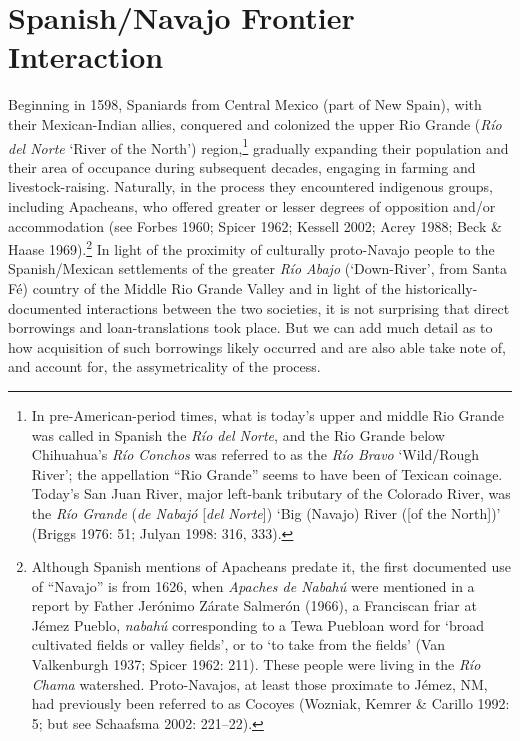 \section{Spanish/Navajo Frontier Interaction}\label{jett:sec:5}

Beginning in 1598, Spaniards from Central Mexico (part of New Spain), with their Mexican-Indian allies, conquered and colonized the upper Rio Grande (\textit{Río del Norte} ‘River of the North’) region,\footnote{In pre-American-period times, what is today’s upper and middle Rio Grande was called in Spanish the \textit{Río del Norte}, and the Rio Grande below Chihuahua’s \textit{Río Conchos} was referred to as the \textit{Río Bravo} ‘Wild/Rough River’; the appellation “Rio Grande” seems to have been of Texican coinage.  Today’s San Juan River, major left-bank tributary of the Colorado River, was the \textit{Río Grande }(\textit{de Nabajó }[\textit{del Norte}]) ‘Big (Navajo) River ([of the North])’ (Briggs 1976: 51; Julyan 1998: 316, 333).} gradually expanding their population and their area of occupance during subsequent decades, engaging in farming and livestock-raising.  Naturally, in the process they encountered indigenous groups, including Apacheans, who offered greater or lesser degrees of opposition and/or accommodation (see Forbes 1960; Spicer 1962; Kessell 2002; Acrey 1988; Beck \& Haase 1969).\footnote{Although Spanish mentions of Apacheans predate it, the first documented use of “Navajo” is from 1626, when \textit{Apaches de Nabahú} were mentioned in a report by Father Jerónimo Zárate Salmerón (1966), a Franciscan friar at Jémez Pueblo, \textit{nabahú} corresponding to a Tewa Puebloan word for ‘broad cultivated fields or valley fields’, or to ‘to take from the fields’ (Van Valkenburgh 1937; Spicer 1962: 211).  These people were living in the \textit{Río Chama} watershed.  Proto-Navajos, at least those proximate to Jémez, NM, had previously been referred to as Cocoyes (Wozniak, Kemrer \& Carillo 1992: 5; but see Schaafsma 2002: 221–22).}  In light of the proximity of culturally proto-Navajo people to the Spanish/Mexican settlements of the greater \textit{Río Abajo} (‘Down-River’, from Santa Fé) country of the Middle Rio Grande Valley and in light of the historically-documented interactions between the two societies, it is not surprising that direct borrowings and loan-translations took place.  But we can add much detail as to how acquisition of such borrowings likely occurred and are also able take note of, and account for, the assymetricality of the process.

